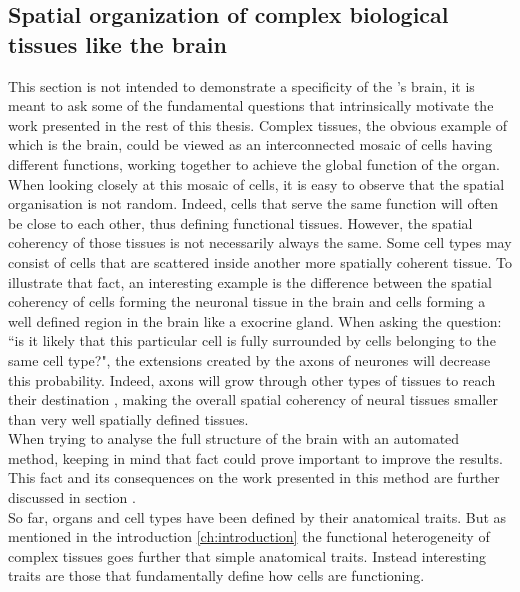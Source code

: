           \subsection{Spatial organization of complex biological tissues like the brain}
     This section is not intended to demonstrate a specificity of the \platy{}'s brain, it is meant to ask some of the fundamental questions that intrinsically motivate the work presented in the rest of this thesis. Complex tissues, the obvious example of which is the brain, could be viewed as an interconnected mosaic of cells having different functions, working together to achieve the global function of the organ.\\
     
     When looking closely at this mosaic of cells, it is easy to observe that the spatial organisation is not random. Indeed, cells that serve the same function will often be close to each other, thus defining functional tissues. However, the spatial coherency of those tissues is not necessarily always the same. Some cell types may consist of cells that are scattered inside another more spatially coherent tissue. To illustrate that fact, an interesting example is the difference between the spatial coherency of cells forming the neuronal tissue in the brain and cells forming a well defined region in the brain like a exocrine gland. When asking the question: ``is it likely that this particular cell is fully surrounded by cells belonging to the same cell type?", the extensions created by the axons of neurones will decrease this probability. Indeed, axons will grow through other types of tissues to reach their destination \cite{bartlett84,colello90}, making the overall spatial coherency of neural tissues smaller than very well spatially defined tissues.\\
     
     When trying to analyse the full structure of the brain with an automated method, keeping in mind that fact could prove important to improve the results. This fact and its consequences on the work presented in this method are further discussed in section .\\
     
     So far, organs and cell types have been defined by their anatomical traits. But as mentioned in the introduction \ref{ch:introduction} the functional heterogeneity of complex tissues goes further that simple anatomical traits. Instead interesting traits are those that fundamentally define how cells are functioning.
     
